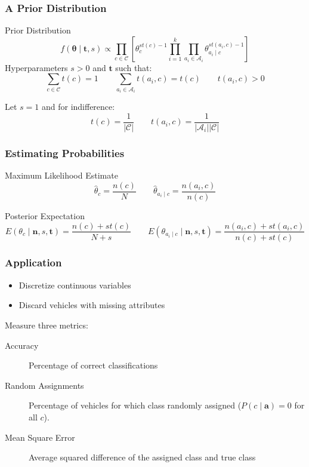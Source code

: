 \documentclass{beamer}
\begin{document}
\begin{frame}
	\frametitle{A Prior Distribution}
	\begin{block}{Prior Distribution}
		\begin{equation}
			f(\mathbf{\theta} \mid \mathbf{t}, s) \propto \prod_{c \in \mathcal{C}} \left[ \theta_c^{st(c) - 1} \prod_{i=1}^k \prod_{a_i \in \mathcal{A}_i} \theta_{a_i \mid c}^{st(a_i, c) - 1} \right]
		\end{equation}
		Hyperparameters $s>0$ and $\mathbf{t}$ such that:
		\begin{equation}
			\sum_{c \in \mathcal{C}} t(c) = 1 \qquad \sum_{a_i \in \mathcal{A}_i} t(a_i, c) = t(c) \qquad t(a_i, c) > 0
		\end{equation}
	\end{block}
	Let $s=1$ and for indifference:
	\begin{equation}
		t(c) = \frac{1}{|\mathcal{C}|} \qquad t(a_i, c) = \frac{1}{|\mathcal{A}_i||\mathcal{C}|}
	\end{equation}
\end{frame}

\begin{frame}
	\frametitle{Estimating Probabilities}
	\begin{block}{Maximum Likelihood Estimate}
		\begin{equation}
			\hat{\theta}_c = \frac{n(c)}{N} \qquad \hat{\theta}_{a_i \mid c} = \frac{n(a_i, c)}{n(c)}
		\end{equation}
	\end{block}
	\begin{block}{Posterior Expectation}
		\begin{equation}
			E(\theta_c \mid \mathbf{n},s,\mathbf{t}) = \frac{n(c) + st(c)}{N + s} \qquad E(\theta_{a_i \mid c} \mid \mathbf{n},s,\mathbf{t}) = \frac{n(a_i, c) + st(a_i, c)}{n(c) + st(c)}
		\end{equation}
	\end{block}
\end{frame}

\begin{frame}
	\frametitle{Application}
	\begin{itemize}
		\item Discretize continuous variables
		\item Discard vehicles with missing attributes
	\end{itemize}

	Measure three metrics:
	\begin{description}
		\item[Accuracy] Percentage of correct classifications
		\item[Random Assignments] Percentage of vehicles for which class randomly assigned ($P(c \mid \mathbf{a}) = 0$ for all $c$).
		\item[Mean Square Error] Average squared difference of the assigned class and true class
	\end{description}
\end{frame}
\end{document}
